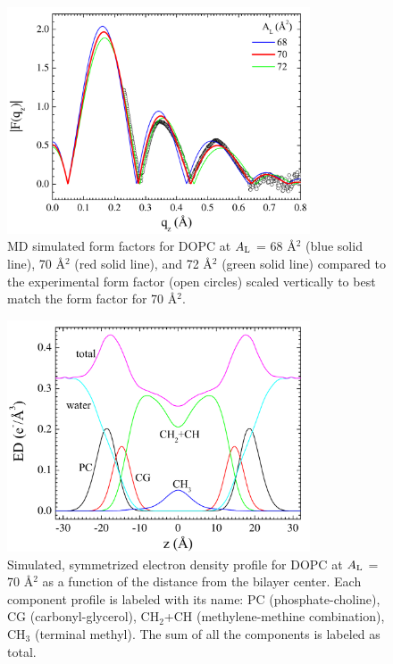 \begin{figure}[htbp]
  \centering
  \includegraphics[width=0.8\textwidth]{figures/Tat/MD_Results/xff/dopc_sim-exp}
  \caption{MD simulated form factors for DOPC at $A_\textrm{L}$ = 68 \AA$^2$ (blue solid line), 
  70 \AA$^2$ (red solid line), and 72 \AA$^2$ (green solid line)
  compared to the experimental form factor (open circles) scaled vertically
  to best match the form factor for 70 \AA$^2$.}
  \label{fig:MD_dopc_sim-exp}
\end{figure}

\begin{figure}[htbp]
  \centering
  \includegraphics[width=0.8\textwidth]{figures/Tat/MD_Results/edp/dopc_70_PC-CG}
  \caption{Simulated, symmetrized electron density profile for DOPC at 
  $A_\textrm{L}$ = 70 \AA$^2$ as a function of the distance from the bilayer center. 
  Each component profile is labeled with its name: PC (phosphate-choline),
  CG (carbonyl-glycerol), CH$_2$+CH (methylene-methine combination), 
  CH$_3$ (terminal methyl). The sum of all the components is labeled as total.}
  \label{fig:MD_dopc_70_PC-CG}
\end{figure}

